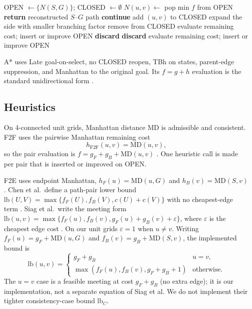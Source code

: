 \begin{algorithm}[tb]
\caption{Best-first SFBDS (shared loop)}
\label{alg:sfbds}
\begin{algorithmic}[1]
\STATE OPEN \(\leftarrow \{N(S,G)\}\); CLOSED \(\leftarrow \emptyset\)
\STATE \(N(u,v) \leftarrow\) pop min \(f\) from OPEN
\STATE \textbf{return} reconstructed \(S\)--\(G\) path
\ENDIF
{}
\STATE \textbf{continue}
\ENDIF
\STATE add \((u,v)\) to CLOSED
\STATE expand the side with smaller branching factor
\STATE remove from CLOSED
\STATE evaluate remaining cost; insert or improve OPEN
\ELSE
\STATE \textbf{discard}
\ENDIF
\ELSE
{}
\STATE \textbf{discard}
\ELSE
\STATE evaluate remaining cost; insert or improve OPEN
\ENDIF
\ENDIF
\ENDFOR
\ENDWHILE
\end{algorithmic}
\end{algorithm}

A* uses Late goal-on-select, no CLOSED reopen, TBh on states, parent-edge suppression, and Manhattan to the original goal. Its \(f=g+h\) evaluation is the standard unidirectional form \cite{hart1968astar}.

\subsection{Heuristics}

On 4-connected unit grids, Manhattan distance \(\mathrm{MD}\) is admissible and consistent. F2F uses the pairwise Manhattan remaining cost
\[
h_{\mathrm{F2F}}(u,v)=\mathrm{MD}(u,v),
\]
so the pair evaluation is \(f=g_F+g_B+\mathrm{MD}(u,v)\) \cite{felner2010sfbds}. One heuristic call is made per pair that is inserted or improved on OPEN.

F2E uses endpoint Manhattan, \(h_F(u)=\mathrm{MD}(u,G)\) and \(h_B(v)=\mathrm{MD}(S,v)\). Chen et al.\ define a path-pair lower bound \(\mathrm{lb}(U,V)=\max\{f_F(U),f_B(V),c(U)+c(V)\}\) with no cheapest-edge term \cite{chen2017nbs}. Siag et al.\ write the meeting form \(\mathrm{lb}(u,v)=\max\{f_F(u),f_B(v),g_F(u)+g_B(v)+\varepsilon\}\), where \(\varepsilon\) is the cheapest edge cost \cite{siag2023ijcai}. On our unit grids \(\varepsilon=1\) when \(u\neq v\). Writing \(f_F(u)=g_F+\mathrm{MD}(u,G)\) and \(f_B(v)=g_B+\mathrm{MD}(S,v)\), the implemented bound is
{\small
\begin{equation}
\label{eq:f2e-lb}
\mathrm{lb}(u,v)=
\begin{cases}
g_F+g_B & u=v,\\
\max(f_F(u), f_B(v), g_F+g_B+1) & \text{otherwise.}
\end{cases}
\end{equation}
}
The \(u=v\) case is a feasible meeting at cost \(g_F+g_B\) (no extra edge); it is our implementation, not a separate equation of Siag et al. We do not implement their tighter consistency-case bound \(\mathrm{lb}_C\).

